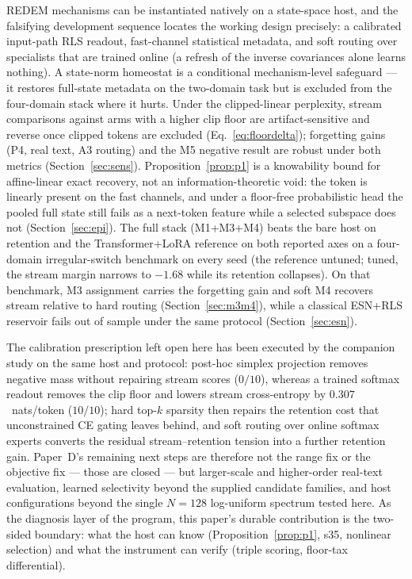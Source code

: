 \documentclass[preprint,12pt]{elsarticle}
\begin{document}
REDEM mechanisms can be instantiated natively on a state-space host,
and the falsifying development sequence locates the working design
precisely: a calibrated input-path RLS readout, fast-channel statistical
metadata, and soft routing over specialists that are trained online (a
refresh of the inverse covariances alone learns nothing). A
state-norm homeostat is a conditional mechanism-level safeguard --- it
restores full-state metadata on the two-domain task but is excluded
from the four-domain stack where it hurts. Under the clipped-linear
perplexity, stream comparisons against arms with a higher clip floor
are artifact-sensitive and reverse once clipped tokens are excluded
(Eq.~\eqref{eq:floordelta}); forgetting gains (P4, real text, A3 routing)
and the M5 negative result are robust under both metrics
(Section~\ref{sec:sens}). Proposition~\ref{prop:p1} is a
knowability bound for affine-linear exact recovery, not an
information-theoretic void: the token is linearly present on the fast
channels, and under a floor-free probabilistic head the pooled full
state still fails as a next-token feature while a selected subspace
does not (Section~\ref{sec:epi}). The full stack (M1+M3+M4)
beats the bare host on retention and the
Transformer+LoRA reference on both reported axes on a
four-domain irregular-switch benchmark on every seed (the reference
untuned; tuned, the stream margin narrows to $-1.68$ while its
retention collapses). On that benchmark, M3 assignment carries the
forgetting gain and soft M4 recovers stream relative to hard routing
(Section~\ref{sec:m3m4}), while a classical ESN+RLS reservoir fails
out of sample under the same protocol (Section~\ref{sec:esn}).

The calibration prescription left open here has been executed by the
companion study \cite{redemf} on the same host and protocol:
post-hoc simplex projection removes negative mass without repairing
stream scores ($0/10$), whereas a trained softmax readout removes the
clip floor and lowers stream cross-entropy by $0.307$~nats/token
($10/10$); hard top-$k$ sparsity then repairs the retention cost that
unconstrained CE gating leaves behind, and soft routing over online
softmax experts converts the residual stream--retention tension into a
further retention gain. Paper~D's remaining next steps are therefore
not the range fix or the objective fix --- those are closed --- but
larger-scale and higher-order real-text evaluation, learned
selectivity beyond the supplied candidate families, and host
configurations beyond the single $N=128$ log-uniform spectrum tested
here. As the diagnosis layer of the program, this paper's durable
contribution is the two-sided boundary: what the host can know
(Proposition~\ref{prop:p1}, s35, nonlinear selection) and what the
instrument can verify (triple scoring, floor-tax differential).
\end{document}
